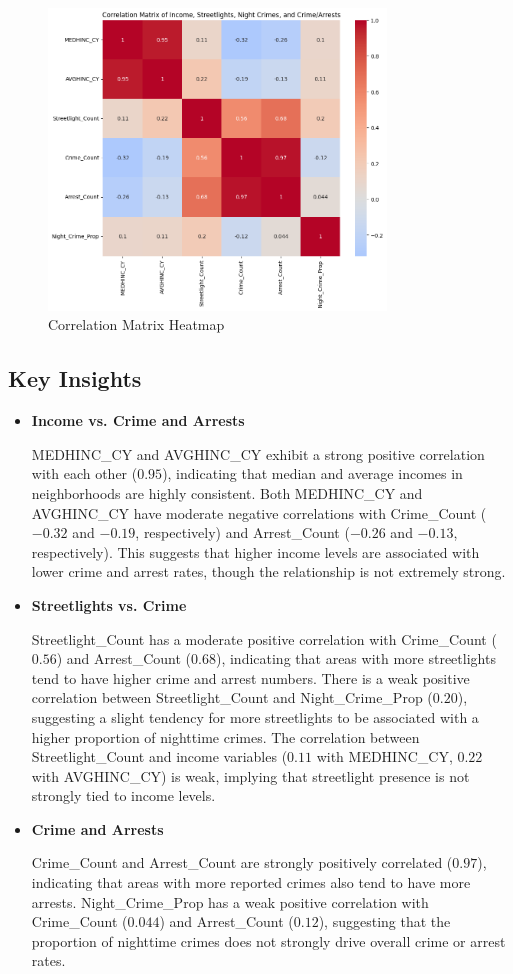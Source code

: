 \documentclass{report}
\begin{document}
\begin{figure}[htbp]
  \centering
  \includegraphics[width=0.8\textwidth]{heatmap.png}
  \caption{Correlation Matrix Heatmap}
  \label{fig:heatmap}
\end{figure}

\subsection{Key Insights}

\begin{itemize}
\item \textbf{Income vs. Crime and Arrests}
  \par MEDHINC\_CY and AVGHINC\_CY exhibit a strong positive correlation with each other ($0.95$), indicating that median and average incomes in neighborhoods are highly consistent. Both MEDHINC\_CY and AVGHINC\_CY have moderate negative correlations with Crime\_Count ($-0.32$ and $-0.19$, respectively) and Arrest\_Count ($-0.26$ and $-0.13$, respectively). This suggests that higher income levels are associated with lower crime and arrest rates, though the relationship is not extremely strong.
\item \textbf{Streetlights vs. Crime}
  \par Streetlight\_Count has a moderate positive correlation with Crime\_Count ($0.56$) and Arrest\_Count ($0.68$), indicating that areas with more streetlights tend to have higher crime and arrest numbers. There is a weak positive correlation between Streetlight\_Count and Night\_Crime\_Prop ($0.20$), suggesting a slight tendency for more streetlights to be associated with a higher proportion of nighttime crimes. The correlation between Streetlight\_Count and income variables ($0.11$ with MEDHINC\_CY, $0.22$ with AVGHINC\_CY) is weak, implying that streetlight presence is not strongly tied to income levels.
\item \textbf{Crime and Arrests}
  \par Crime\_Count and Arrest\_Count are strongly positively correlated ($0.97$), indicating that areas with more reported crimes also tend to have more arrests. Night\_Crime\_Prop has a weak positive correlation with Crime\_Count ($0.044$) and Arrest\_Count ($0.12$), suggesting that the proportion of nighttime crimes does not strongly drive overall crime or arrest rates.
\end{itemize}
\end{document}
